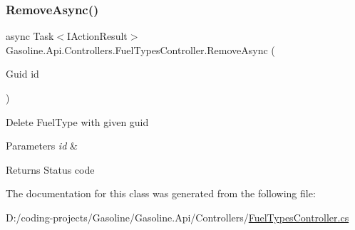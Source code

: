 \subsubsection{\texorpdfstring{RemoveAsync()}{RemoveAsync()}}
{\footnotesize\ttfamily async Task$<$I\+Action\+Result$>$ Gasoline.\+Api.\+Controllers.\+Fuel\+Types\+Controller.\+Remove\+Async (\begin{DoxyParamCaption}\item[{Guid}]{id }\end{DoxyParamCaption})}



Delete Fuel\+Type with given guid 


\begin{DoxyParams}{Parameters}
{\em id} & \\
\hline
\end{DoxyParams}
\begin{DoxyReturn}{Returns}
Status code
\end{DoxyReturn}


The documentation for this class was generated from the following file\+:\begin{DoxyCompactItemize}
\item 
D\+:/coding-\/projects/\+Gasoline/\+Gasoline.\+Api/\+Controllers/\mbox{\hyperlink{_fuel_types_controller_8cs}{Fuel\+Types\+Controller.\+cs}}\end{DoxyCompactItemize}
